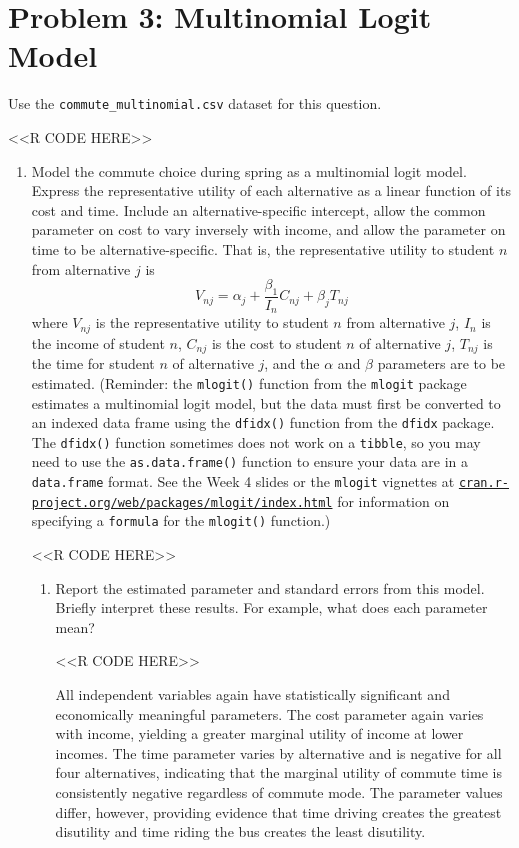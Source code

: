 \documentclass[11pt,letterpaper]{article}
\begin{document}
\section*{Problem 3: Multinomial Logit Model}

Use the \texttt{commute\_multinomial.csv} dataset for this question.

<<R CODE HERE>>

\begin{enumerate}[label=\alph*., leftmargin=*]
	\item Model the commute choice during spring as a multinomial logit model. Express the representative utility of each alternative as a linear function of its cost and time. Include an alternative-specific intercept, allow the common parameter on cost to vary inversely with income, and allow the parameter on time to be alternative-specific. That is, the representative utility to student $n$ from alternative $j$ is
	$$V_{nj} = \alpha_j + \frac{\beta_1}{I_n} C_{nj} + \beta_j T_{nj}$$
	where $V_{nj}$ is the representative utility to student $n$ from alternative $j$, $I_n$ is the income of student $n$, $C_{nj}$ is the cost to student $n$ of alternative $j$, $T_{nj}$ is the time for student $n$ of alternative $j$, and the $\alpha$ and $\beta$ parameters are to be estimated. (Reminder: the \texttt{mlogit()} function from the \texttt{mlogit} package estimates a multinomial logit model, but the data must first be converted to an indexed data frame using the \texttt{dfidx()} function from the \texttt{dfidx} package. The \texttt{dfidx()} function sometimes does not work on a \texttt{tibble}, so you may need to use the \texttt{as.data.frame()} function to ensure your data are in a \texttt{data.frame} format. See the Week 4 slides or the \texttt{mlogit} vignettes at \href{https://cran.r-project.org/web/packages/mlogit/index.html}{\texttt{cran.r-project.org/web/packages/mlogit/index.html}} for information on specifying a \texttt{formula} for the \texttt{mlogit()} function.)

	<<R CODE HERE>>

	\begin{enumerate}[label=\roman*.]
		\item Report the estimated parameter and standard errors from this model. Briefly interpret these results. For example, what does each parameter mean?

		<<R CODE HERE>>

		All independent variables again have statistically significant and economically meaningful parameters. The cost parameter again varies with income, yielding a greater marginal utility of income at lower incomes. The time parameter varies by alternative and is negative for all four alternatives, indicating that the marginal utility of commute time is consistently negative regardless of commute mode. The parameter values differ, however, providing evidence that time driving creates the greatest disutility and time riding the bus creates the least disutility.


\end{enumerate}
\end{enumerate}
\end{document}
